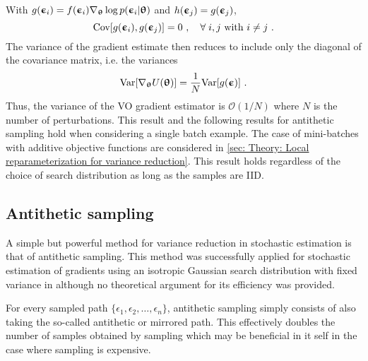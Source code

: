 With $g({\boldsymbol{\upepsilon}}_i) = f({\boldsymbol{\upepsilon}}_i) \nabla_{\boldsymbol{\uptheta}}\log p({\boldsymbol{\upepsilon}}_i|{\boldsymbol{\uptheta}})$ and $h({\boldsymbol{\upepsilon}}_j)=g({\boldsymbol{\upepsilon}}_j)$,
\begin{equation}
     \text{Cov}{\left[g({\boldsymbol{\upepsilon}}_i), g({\boldsymbol{\upepsilon}}_j)\right]} = 0 \ ,\quad \forall\;i,j \text{ with } i\ne j \ .
\end{equation}
The variance of the gradient estimate then reduces to include only the diagonal of the covariance matrix, i.e. the variances
\begin{equation}
    \text{Var}{\left[\nabla_{\boldsymbol{\uptheta}}U({\boldsymbol{\uptheta}})\right]} = \frac{1}{N} \text{Var}{\left[g({\boldsymbol{\upepsilon}})\right]} \ .\label{eq: Theory: Variance of regular Monte Carlo VO gradient estimator for arbitrary search distribution}
\end{equation}
Thus, the variance of the \gls{VO} gradient estimator is $\mathcal{O}(1/N)$ where $N$ is the number of perturbations. This result and the following results for antithetic sampling hold when considering a single batch example. The case of mini-batches with additive objective functions are considered in \autoref{sec: Theory: Local reparameterization for variance reduction}. 
This result holds regardless of the choice of search distribution as long as the samples are \gls{IID}.


\subsection{Antithetic sampling}\label{sec: Theory: Antithetic sampling}
A simple but powerful method for variance reduction in stochastic estimation is that of antithetic sampling. This method was successfully applied for stochastic estimation of gradients using an isotropic Gaussian search distribution with fixed variance in \cite{Salimans2017} although no theoretical argument for its efficiency was provided.

For every sampled path $\{\epsilon_1,\epsilon_2,\dots,\epsilon_n\}$, antithetic sampling simply consists of also taking the so-called antithetic or mirrored path.
This effectively doubles the number of samples obtained by sampling which may be beneficial in it self in the case where sampling is expensive.

